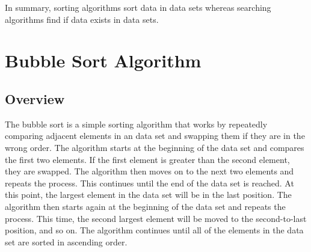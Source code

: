 \documentclass[a4paper,9pt]{article}
\begin{document}
\noindent In summary, sorting algorithms sort data in data sets whereas searching algorithms find if data exists in data sets.

\clearpage

\section*{Bubble Sort Algorithm}

\subsection*{Overview}

The bubble sort is a simple sorting algorithm that works by repeatedly comparing adjacent elements in an data set and swapping them if they are in the wrong order. The algorithm starts at the beginning of the data set and compares the first two elements. If the first element is greater than the second element, they are swapped. The algorithm then moves on to the next 
two elements and repeats the process. This continues until the end of the data set is reached. At this point, the largest element in the data set will be in the last position. The algorithm then starts again at the beginning of the data set and repeats the process. This time, the second largest element will be moved to the second-to-last position, and so on. The 
algorithm continues until all of the elements in the data set are sorted in ascending order.
\end{document}
